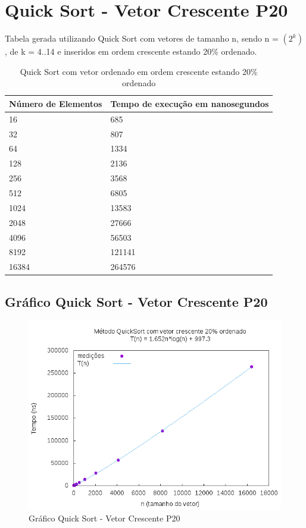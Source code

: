 \documentclass[12pt,a4paper,twoside]{report}
\begin{document}
\section{Quick Sort - Vetor Crescente P20}
Tabela gerada utilizando Quick Sort com vetores de tamanho n, sendo n = $(2^k)$, de k = 4..14 e inseridos em ordem crescente estando 20\% ordenado.
\begin{table}[H]
\centering
\caption{Quick Sort com vetor ordenado em ordem crescente estando 20\% ordenado}
\label{my-label}
\begin{tabular}{|l|l|}
\hline
\multicolumn{1}{|c|}{\textbf{Número de Elementos}} & \multicolumn{1}{c|}{\textbf{Tempo de execução em nanosegundos}} \\ \hline
16 & 685 \\ \hline
32 & 807 \\ \hline
64 & 1334 \\ \hline
128 & 2136 \\ \hline
256 & 3568 \\ \hline
512 & 6805 \\ \hline
1024 & 13583 \\ \hline
2048 & 27666 \\ \hline
4096 & 56503 \\ \hline
8192 & 121141 \\ \hline
16384 & 264576 \\ \hline
\end{tabular}
\end{table}

\subsection{Gráfico Quick Sort - Vetor Crescente P20}
\begin{figure}[H]
    \centering
    \includegraphics[width=0.7\linewidth]{graficos/QuickSort/vIntCrescenteP20/vIntCrescenteP20.png}
  \caption{Gráfico Quick Sort - Vetor Crescente P20}
\end{figure}
\end{document}
